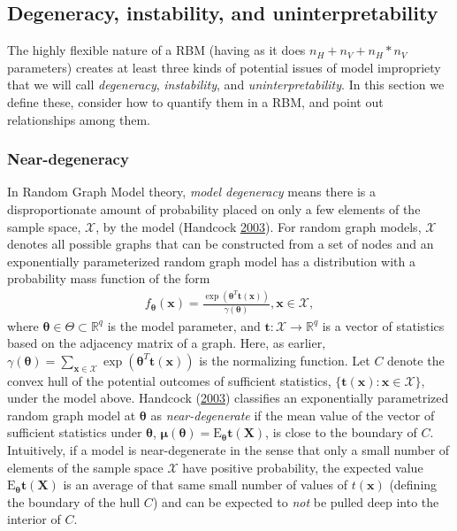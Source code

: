 \documentclass[12pt]{article}
\theoremstyle{definition}
\newcommand{\nv}{{n_{\scriptscriptstyle V}}}
\newcommand{\nh}{{n_{\scriptscriptstyle H}}}
\begin{document}
\subsection{Degeneracy, instability, and
uninterpretability}\label{degeneracy-instability-and-uninterpretability}

The highly flexible nature of a RBM (having as it does
\(\nh + \nv + \nh*\nv\) parameters) creates at least three kinds of
potential issues of model impropriety that we will call
\emph{degeneracy}, \emph{instability}, and \emph{uninterpretability}. In
this section we define these, consider how to quantify them in a RBM,
and point out relationships among them.

\subsubsection{Near-degeneracy}\label{near-degeneracy}

In Random Graph Model theory, \emph{model degeneracy} means there is a
disproportionate amount of probability placed on only a few elements of
the sample space, \(\mathcal{X}\), by the model (Handcock
\protect\hyperlink{ref-handcock2003assessing}{2003}). For random graph
models, \(\mathcal{X}\) denotes all possible graphs that can be
constructed from a set of nodes and an exponentially parameterized
random graph model has a distribution with a probability mass function
of the form
\begin{align*}
f_{\boldsymbol \theta} (\boldsymbol x) = \frac{\exp\left(\boldsymbol \theta^T \boldsymbol t(\boldsymbol x)\right)}{\gamma(\boldsymbol \theta)}, \boldsymbol x \in \mathcal{X},
\end{align*}
where \(\boldsymbol \theta \in \Theta \subset \mathbb{R}^q\) is the
model parameter, and
\(\boldsymbol t: \mathcal{X} \rightarrow \mathbb{R}^q\) is a vector of
statistics based on the adjacency matrix of a graph. Here, as earlier,
\(\gamma(\boldsymbol \theta) = \sum_{\boldsymbol x \in \mathcal{X}} \exp\left(\boldsymbol \theta^T \boldsymbol t(\boldsymbol x)\right)\)
is the normalizing function. Let \(C\) denote the convex hull of the
potential outcomes of sufficient statistics,
\(\{\boldsymbol t(\boldsymbol x): \boldsymbol x \in \mathcal{X}\}\),
under the model above. Handcock
(\protect\hyperlink{ref-handcock2003assessing}{2003}) classifies an
exponentially parametrized random graph model at \(\boldsymbol \theta\)
as \emph{near-degenerate} if the mean value of the vector of sufficient
statistics under \(\boldsymbol \theta\),
\(\boldsymbol \mu(\boldsymbol \theta) = \text{E}_{\boldsymbol \theta}\boldsymbol t( \boldsymbol X)\),
is close to the boundary of \(C\). Intuitively, if a model is
near-degenerate in the sense that only a small number of elements of the
sample space \(\mathcal{X}\) have positive probability, the expected
value \(\text{E}_{\boldsymbol \theta}\boldsymbol t( \boldsymbol X)\) is
an average of that same small number of values of \(t( \boldsymbol x)\)
(defining the boundary of the hull \(C\)) and can be expected to
\emph{not} be pulled deep into the interior of \(C\).
\end{document}
